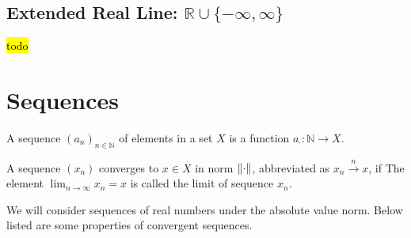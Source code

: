 \subsection{Extended Real Line: $\mathbb{R}\cup\{-\infty,\infty\}$}
\hl{todo}


\section{Sequences}
\begin{definition}[Sequence]
    A sequence $(a_n)_{n\in\mathbb{N}}$ of elements in a set $X$ is a function $a_\cdot:\mathbb{N}\rightarrow X$.
\end{definition}

\begin{definition}
    A sequence $(x_n)$ converges to $x\in X$ in norm $\norm{\cdot}$, abbreviated as $x_n\xrightarrow{n} x$, if
    The element $\lim_{n\rightarrow\infty}x_n=x$ is called the limit of sequence $x_n.$
\end{definition}


We will consider sequences of real numbers under the absolute value norm. Below listed are some properties of convergent sequences.

